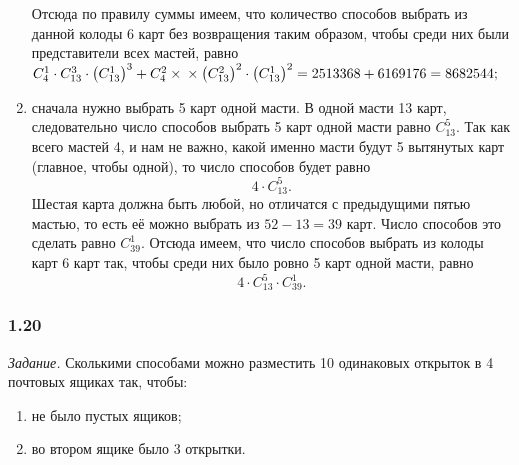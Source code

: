 \begin{enumerate}[label=\alph*)]
Отсюда по правилу суммы имеем, что количество способов выбрать из данной колоды 6 карт без возвращения таким образом, чтобы среди них были представители всех мастей, равно
$C_4^1 \cdot C_{13}^3 \cdot \left( C_{13}^1 \right)^3 + C_4^2 \times \\
\times \left( C_{13}^2 \right)^2 \cdot \left( C_{13}^1 \right)^2 =
2513368 + 6169176 =
8682544;$

\item сначала нужно выбрать 5 карт одной масти.
В одной масти 13 карт, следовательно число способов выбрать 5 карт одной масти равно $ C_{13}^5 $.
Так как всего мастей 4, и нам не важно, какой именно масти будут 5 вытянутых карт (главное, чтобы одной), то число способов будет равно
$$ 4 \cdot C_{13}^5.$$
Шестая карта должна быть любой, но отличатся с предыдущими пятью мастью, то есть её можно выбрать из $ 52 - 13 = 39 $ карт.
Число способов это сделать равно $ C_{39}^1 $.
Отсюда имеем, что число способов выбрать из колоды карт 6 карт так, чтобы среди них было ровно 5 карт одной масти, равно
$$ 4 \cdot C_{13}^5 \cdot C_{39}^1.$$
\end{enumerate}

\subsubsection*{1.20}

\textit{Задание.} Сколькими способами можно разместить 10 одинаковых открыток в 4 почтовых ящиках так, чтобы:
\begin{enumerate}[label=\alph*)]
\item не было пустых ящиков;
\item во втором ящике было 3 открытки.
\end{enumerate}


